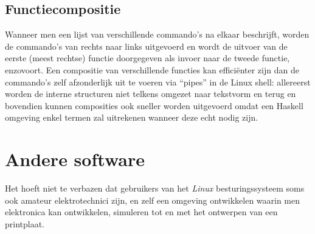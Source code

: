 \subsection{Functiecompositie}
Wanneer men een lijst van verschillende commando's na elkaar beschrijft, worden de commando's van rechts naar links uitgevoerd en wordt de uitvoer van de eerste (meest rechtse) functie doorgegeven als invoer naar de tweede functie, enzovoort. Een compositie van verschillende functies kan effici\"enter zijn dan de commando's zelf afzonderlijk uit te voeren via ``pipes'' in de Linux shell: allereerst worden de interne structuren niet telkens omgezet naar tekstvorm en terug en bovendien kunnen composities ook sneller worden uitgevoerd omdat een Haskell omgeving enkel termen zal uitrekenen wanneer deze echt nodig zijn.

\section{Andere software}
Het hoeft niet te verbazen dat gebruikers van het \emph{Linux} besturingssysteem soms ook amateur elektrotechnici zijn, en zelf een omgeving ontwikkelen waarin men elektronica kan ontwikkelen, simuleren tot en met het ontwerpen van een printplaat.